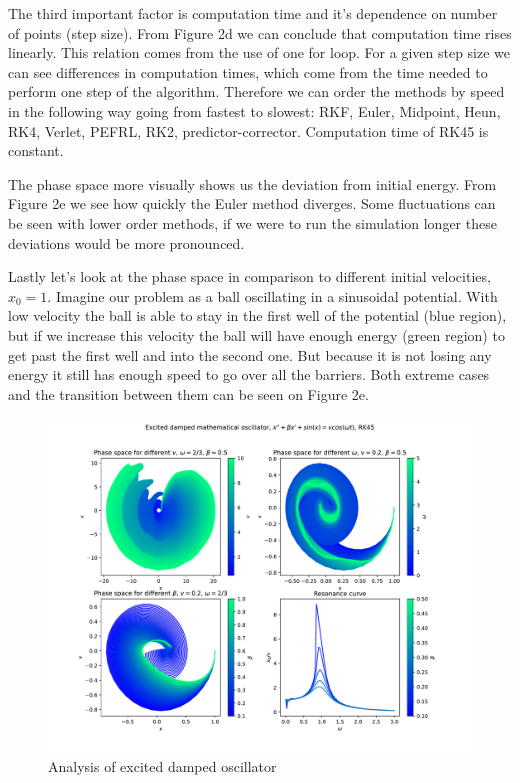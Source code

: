 \documentclass[12pt, a4paper]{article}
\begin{document}
The third important factor is computation time and it’s dependence on number of points (step size). From Figure 2d we can conclude that computation time rises linearly. This relation comes from the use of one for loop. For a given step size we can see differences in computation times, which come from the time needed to perform one step of the algorithm. Therefore we can order the methods by speed in the following way going from fastest to slowest: RKF, Euler, Midpoint, Heun, RK4, Verlet, PEFRL, RK2, predictor-corrector. Computation time of RK45 is constant.

The phase space more visually shows us the deviation from initial energy. From Figure 2e we see how quickly the Euler method diverges. Some fluctuations can be seen with lower order methods, if we were to run the simulation longer these deviations would be more pronounced.

Lastly let's look at the phase space in comparison to different initial velocities, $x_0 = 1$. Imagine our problem as a ball oscillating in a sinusoidal potential. With low velocity the ball is able to stay in the first well of the potential (blue region), but if we increase this velocity the ball will have enough energy (green region) to get past the first well and into the second one. But because it is not losing any energy it still has enough speed to go over all the barriers. Both extreme cases and the transition between them can be seen on Figure 2e.

\begin{figure}[hbtp]
  \begin{center}
  \includegraphics[width=15cm]{graphs/resonance2.pdf}
  \end{center}
  \vspace*{-7mm}
  \caption{Analysis of excited damped oscillator}
\end{figure}
\end{document}
